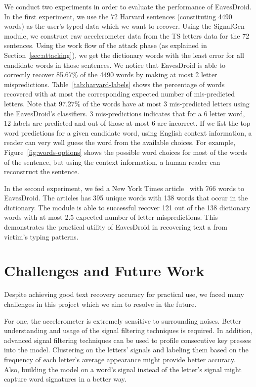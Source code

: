 \documentclass[11pt,conference]{IEEEtran}
\begin{document}
We conduct two experiments in order to evaluate the performance of EavesDroid.
In the first experiment, we use the 72 Harvard sentences (constituting 4490 words) as the user's typed data
which we want to recover. Using the SignalGen module, we construct raw accelerometer
data from the TS letters data for the 72 sentences. Using the work flow
of the attack phase (as explained in Section~\ref{sec:attacking}), we get the dictionary
words with the least error for all candidate words in those sentences. We notice that
EavesDroid is able to correctly recover 85.67\% of the 4490 words by making at most 2 letter
mispredictions. Table~\ref{tab:harvard-labels}
shows the percentage of words recovered with at most the corresponding expected number of mis-predicted letters.
Note that 97.27\% of the words have at most 3 mis-predicted letters using
the EavesDroid's classifiers. 3 mis-predictions indicates that for a 6 letter word, 12 labels are predicted and out of
those at most 6 are incorrect. If we list the top word predictions for a given candidate word,
using English context information, a reader can very well guess the word from the available
choices. For example, Figure~\ref{fig:words-options} shows the possible word choices
for most of the words of the sentence, but using the context information, a human reader
can reconstruct the sentence.

In the second experiment, we fed a New York Times article~\cite{bats-nytimes} with 766 words
to EavesDroid. The articles has 395 unique words with 138 words that occur in the dictionary.
The module is able to successful recover 121 out of the 138 dictionary words with at most 2.5 expected
number of letter mispredictions. This demonstrates the practical utility of EavesDroid in recovering text a from victim's typing patterns.

\section{Challenges and Future Work}
Despite achieving good text recovery accuracy for practical use, we faced many challenges in
this project which we aim to resolve in the future. 

For one, the accelerometer is extremely sensitive to surrounding noises. Better understanding and usage of the signal
filtering techniques is required. In addition, advanced signal filtering techniques can be used to
profile consecutive key presses into the model. Clustering on the letters' signals and labeling them based on the frequency of
each letter's average appearance might provide better accuracy. Also, building the model on a word's signal
instead of the letter's signal might capture word signatures in a better way.
\end{document}
